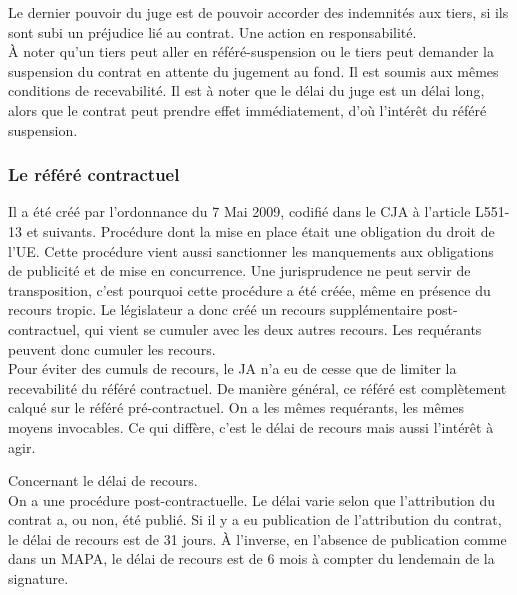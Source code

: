 \documentclass[10pt, a4paper, openany]{book}
\begin{document}
Le dernier pouvoir du juge est de pouvoir accorder des indemnités aux tiers, si ils sont subi un préjudice lié au contrat. Une action en responsabilité. \\
À noter qu'un tiers peut aller en référé-suspension ou le tiers peut demander la suspension du contrat en attente du jugement au fond. Il est soumis aux mêmes conditions de recevabilité. Il est à noter que le délai du juge est un délai long, alors que le contrat peut prendre effet immédiatement, d'où l'intérêt du référé suspension. 

\subsubsection{Le référé contractuel}

Il a été créé par l'ordonnance du 7 Mai 2009, codifié dans le CJA à l'article L551-13 et suivants. Procédure dont la mise en place était une obligation du droit de l'UE. Cette procédure vient aussi sanctionner les manquements aux obligations de publicité et de mise en concurrence. Une jurisprudence ne peut servir de transposition, c'est pourquoi cette procédure a été créée, même en présence du recours tropic. Le législateur a donc créé un recours supplémentaire post-contractuel, qui vient se cumuler avec les deux autres recours. Les requérants peuvent donc cumuler les recours. \\
Pour éviter des cumuls de recours, le JA n'a eu de cesse que de limiter la recevabilité du référé contractuel. De manière général, ce référé est complètement calqué sur le référé pré-contractuel. On a les mêmes requérants, les mêmes moyens invocables. Ce qui diffère, c'est le délai de recours mais aussi l'intérêt à agir.


Concernant le délai de recours. \\
On a une procédure post-contractuelle. Le délai varie selon que l'attribution du contrat a, ou non, été publié. Si il y a eu publication de l'attribution du contrat, le délai de recours est de 31 jours. À l'inverse, en l'absence de publication comme dans un MAPA, le délai de recours est de 6 mois à compter du lendemain de la signature. 
\end{document}

